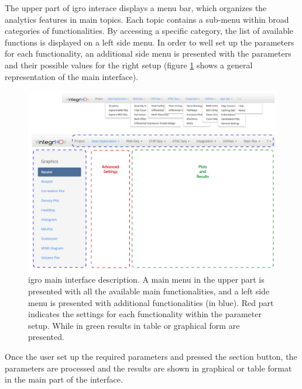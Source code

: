 The upper part of \gls{igro} interace displays a menu bar, which organizes the analytics features in main topics.
Each topic contains a sub-menu within broad categories of functionalities.
By accessing a specific category, the list of available functions is displayed on a left side menu.
In order to well set up the parameters for each functionality, an additional side menu is presented with the parameters and their possible values for the right setup (figure \ref{fig:integrhomain} shows a general representation of the main interface).

\begin{figure}[ht]
\centering
\includegraphics[width=\textwidth, keepaspectratio]{img/integrho/interface.png}
\caption[\gls{igro} main interface]{\gls{igro} main interface description. A main menu in the upper part is presented with all the available main functionalities, and a left side menu is presented with additional functionalities (in blue). Red part indicates the settings for each functionality within the parameter setup. While in green results in table or graphical form are presented.}
\label{fig:integrhomain}
\end{figure}

Once the user set up the required parameters and pressed the section button, the parameters are processed and the results are shown in graphical or table format in the main part of the interface.

